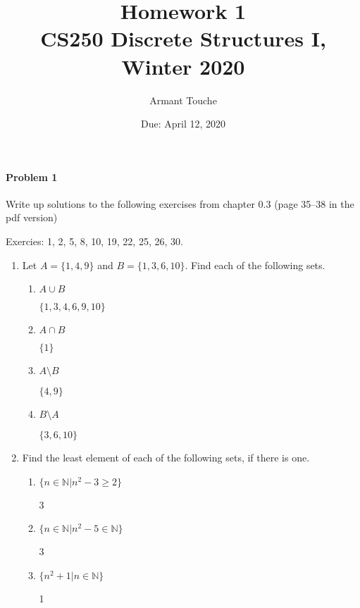 \documentclass[11pt, a4paper]{article}
\title{\bf Homework 1\\[1ex]
\rm\normalsize CS250 Discrete Structures I, Winter 2020 }
\date{\normalsize Due: April 12, 2020}
\author{\normalsize Armant Touche}
\begin{document}
 

\vspace{0cm}\maketitle 

\paragraph{Problem 1} Write up solutions to the following exercises from chapter 0.3 (page 35–38 in the pdf version)

Exercies: 1, 2, 5, 8, 10, 19, 22, 25, 26, 30.

\begin{enumerate}

    \item Let $A = \{1,4,9\}$ and $B = \{1,3,6,10\}$. Find each of the following sets.
        \begin{enumerate}
            \item $A\cup B$

                $\{1,3,4,6,9,10\}$

            \item $A\cap B$

                $\{1\}$

            \item $A\setminus B$

                $\{4,9\}$

            \item $B\setminus A$

                $\{3,6,10\}$

        \end{enumerate}

    \item Find the least element of each of the following sets, if there is one.
        \begin{enumerate}
            \item $\{n \in\mathbb{N}| n^2 - 3 \geq 2\}$
                
                3

            \item $\{n \in\mathbb{N}| n^2 - 5 \in \mathbb{N}\}$

                3

            \item $\{n^2 + 1| n \in\mathbb{N}\}$

                1


\end{enumerate}
\end{enumerate}
\end{document}
